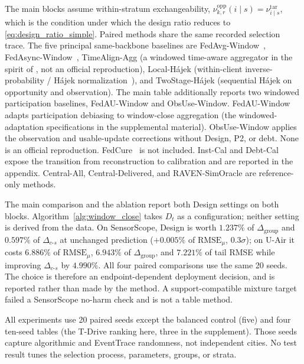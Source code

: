 \documentclass[letterpaper,journal]{IEEEtran}
\begin{document}
The main blocks assume within-stratum exchangeability,
$\nu^{\mathrm{opp}}_{k,r}(i\mid s)=\nu^{\mathrm{tar}}_{i\mid s}$, which is the
condition under which the design ratio reduces to
\eqref{eq:design_ratio_simple}.  Paired methods share the same recorded selection trace.
The five principal same-backbone baselines are
FedAvg-Window~\cite{mcmahan2017communication},
FedAsync-Window~\cite{xie2019asynchronous},
TimeAlign-Agg (a windowed time-aware aggregator in the spirit of
\cite{wang2026federated}, not an official reproduction),
Local-H\'ajek (within-client inverse-probability / H\'ajek
normalization~\cite{horvitz1952generalization,hajek1971comment}), and
TwoStage-H\'ajek (sequential H\'ajek on opportunity and
observation).  The main table additionally
reports two windowed participation baselines, FedAU-Window and
ObsUse-Window.  FedAU-Window adapts participation debiasing
\cite{wang2024lightweight} to window-close aggregation
(the windowed-adaptation specifications in the supplemental material).
ObsUse-Window applies the observation and usable-update
corrections without Design, P2, or debt.  None is an official
reproduction.  FedCure~\cite{chen2026fedcure} is not included.  Inst-Cal and Debt-Cal
expose the transition from reconstruction to calibration and are
reported in the appendix.  Central-All, Central-Delivered, and
RAVEN-SimOracle are reference-only methods.

The main comparison and the ablation report both Design settings on both
blocks.  Algorithm~\ref{alg:window_close} takes $D_t$ as a configuration;
neither setting is derived from the data.  On SensorScope, Design is worth
$1.237\%$ of $\Delta_{\mathrm{group}}$ and $0.597\%$ of
$\Delta_{c\text{-}s}$ at unchanged prediction ($+0.005\%$ of
$\mathrm{RMSE}_{\mu}$, $0.3\sigma$); on U-Air it costs $6.886\%$ of
$\mathrm{RMSE}_{\mu}$, $6.943\%$ of $\Delta_{\mathrm{group}}$, and $7.221\%$
of tail RMSE while improving $\Delta_{c\text{-}s}$ by $4.990\%$.  All four
paired comparisons use the same 20 seeds.  The choice is therefore an
endpoint-dependent deployment decision, and is reported rather than made by
the method.  A support-compatible mixture target failed a
SensorScope no-harm check and is not a table method.

All experiments use 20 paired seeds except the balanced control (five) and four ten-seed tables (the T-Drive
ranking here, three in the supplement).  Those seeds capture algorithmic and EventTrace randomness, not independent
cities.  No test result tunes the selection process, parameters, groups, or strata.
\end{document}
